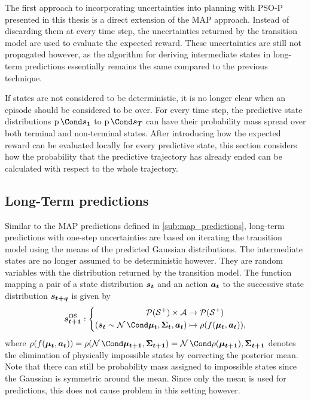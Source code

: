 The first approach to incorporating uncertainties into planning with PSO-P presented in this thesis is a direct extension of the MAP approach.
Instead of discarding them at every time step, the uncertainties returned by the transition model are used to evaluate the expected reward.
These uncertainties are still not propagated however, as the algorithm for deriving intermediate states in long-term predictions essentially remains the same compared to the previous technique.

If states are not considered to be deterministic, it is no longer clear when an episode should be considered to be over.
For every time step, the predictive state distributions $\Prob{\mat{s_1}}$ to $\Prob{\mat{s_T}}$ can have their probability mass spread over both terminal and non-terminal states.
After introducing how the expected reward can be evaluated locally for every predictive state, this section considers how the probability that the predictive trajectory has already ended can be calculated with respect to the whole trajectory.

\subsection{Long-Term predictions}
\label{sub:os_predictions}
Similar to the MAP predictions defined in \cref{sub:map_predictions}, long-term predictions with one-step uncertainties are based on iterating the transition model using the means of the predicted Gaussian distributions.
The intermediate states are no longer assumed to be deterministic however.
They are random variables with the distribution returned by the transition model.
The function mapping a pair of a state distribution $\bm{s_t}$ and an action $\bm{a_t}$ to the successive state distribution $\bm{s_{t+q}}$ is given by
\begin{align}
    \os{\mat{s_{t+1}}} : \left\{
        \begin{aligned}
            \Dists(\Es^+) \times \Ah &\to \Dists(\Es^+) \\
            (\mat{s_t} \sim \Gaussian{\mat{\mu_t}, \mat{\Sigma_t}}, \mat{a_t}) &\mapsto \squeeze(f(\mat{\mu_t}, \mat{a_t})),
    \end{aligned}
    \right.
\end{align}
where $\squeeze(f(\mat{\mu_t}, \mat{a_t})) = \squeeze(\Gaussian{\mat{\mu_{t+1}}, \mat{\Sigma_{t+1}}}) = \Gaussian{\squeeze(\mat{\mu_{t+1}}), \mat{\Sigma_{t+1}}}$ denotes the elimination of physically impossible states by correcting the posterior mean.
Note that there can still be probability mass assigned to impossible states since the Gaussian is symmetric around the mean.
Since only the mean is used for predictions, this does not cause problem in this setting however.

